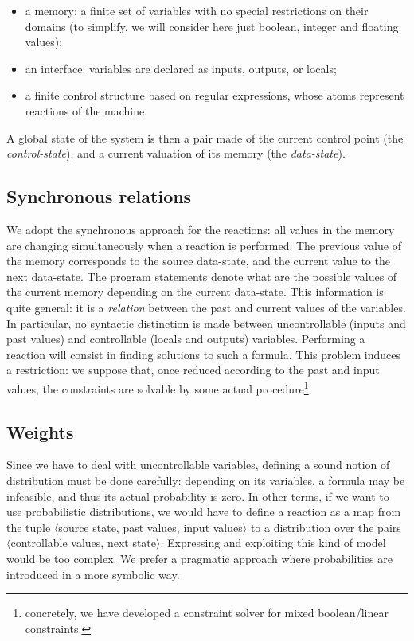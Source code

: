 \begin{itemize}
\item  a  memory:   a  finite  set  of  variables   with  no  special
  restrictions on  their domains (to simplify, we  will consider here
  just boolean, integer and floating values);
\item  an interface: variables  are declared  as inputs,  outputs, or
  locals;
\item a finite control  structure based on regular expressions, whose
  atoms represent reactions of the machine.
\end{itemize}

A  global state of  the system  is then  a pair  made of  the current
control point  (the {\em control-state}), and a  current valuation of
its  memory (the  {\em  data-state}).  

\subsection{Synchronous relations}
We adopt  the synchronous approach  for the reactions: all  values in
the memory are changing  simultaneously when a reaction is performed.
The  previous   value  of  the  memory  corresponds   to  the  source
data-state,  and  the current  value  to  the  next data-state.   The
program statements denote what are the possible values of the current
memory  depending on  the  current data-state.   This information  is
quite general:  it is a {\em  relation} between the  past and current
values of the variables.   In particular, no syntactic distinction is
made between uncontrollable (inputs and past values) and controllable
(locals and  outputs) variables.  Performing a  reaction will consist
in  finding solutions  to such  a  formula.  This  problem induces  a
restriction: we suppose that, once  reduced according to the past and
input   values,  the   constraints  are   solvable  by   some  actual
procedure\footnote{concretely, we have  developed a constraint solver
  for mixed boolean/linear constraints.}.


\subsection{Weights}
Since we have to deal with uncontrollable variables, defining a sound
notion  of distribution  must  be done  carefully:  depending on  its
variables,  a  formula  may   be  infeasible,  and  thus  its  actual
probability is zero.  In other terms, if we want to use probabilistic
distributions, we would  have to define a reaction as  a map from the
tuple $\langle$source state, past  values, input values$\rangle$ to a
distribution  over  the   pairs  $\langle$controllable  values,  next
state$\rangle$.  Expressing  and exploiting this kind  of model would
be too  complex. We prefer  a pragmatic approach  where probabilities
are introduced in a more symbolic way.

